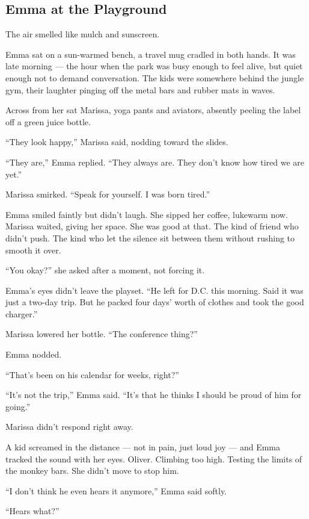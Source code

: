 
\subsection{Emma at the Playground}

The air smelled like mulch and sunscreen.

Emma sat on a sun-warmed bench, a travel mug cradled in both hands. It was late morning — the hour 
when the park was busy enough to feel alive, but quiet enough not to demand conversation. The kids 
were somewhere behind the jungle gym, their laughter pinging off the metal bars and rubber mats in 
waves.

Across from her sat Marissa, yoga pants and aviators, absently peeling the label off a green juice bottle.

``They look happy,'' Marissa said, nodding toward the slides.

``They are,'' Emma replied. ``They always are. They don’t know how tired we are yet.''

Marissa smirked. ``Speak for yourself. I was born tired.''

Emma smiled faintly but didn’t laugh. She sipped her coffee, lukewarm now. Marissa waited, giving her 
space. She was good at that. The kind of friend who didn’t push. The kind who let the silence sit between 
them without rushing to smooth it over.

``You okay?'' she asked after a moment, not forcing it.

Emma’s eyes didn’t leave the playset. ``He left for D.C. this morning. Said it was just a two-day trip. 
But he packed four days’ worth of clothes and took the good charger.''

Marissa lowered her bottle. ``The conference thing?''

Emma nodded.

``That’s been on his calendar for weeks, right?''

``It’s not the trip,'' Emma said. ``It’s that he thinks I should be proud of him for going.''

Marissa didn’t respond right away.

A kid screamed in the distance --- not in pain, just loud joy --- and Emma tracked the sound with her eyes. 
Oliver. Climbing too high. Testing the limits of the monkey bars. She didn't move to stop him.

``I don’t think he even hears it anymore,'' Emma said softly.

``Hears what?''

